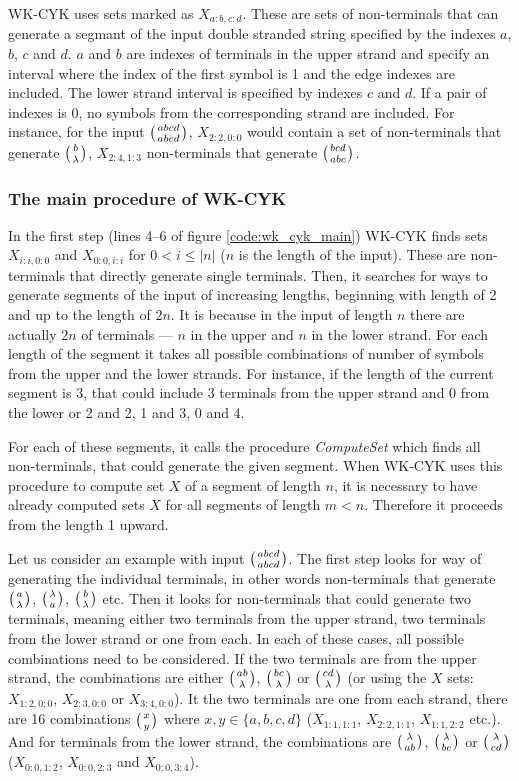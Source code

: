WK-CYK uses sets marked as $X_{a:b,c:d}$. These are sets of non-terminals that can generate a segmant of the input double stranded string specified by the indexes $a$, $b$, $c$ and $d$. $a$ and $b$ are indexes of terminals in the upper strand and specify an interval where the index of the first symbol is 1 and the edge indexes are included. The lower strand interval is specified by indexes $c$ and $d$. If a pair of indexes is 0, no symbols from the corresponding strand are included. For instance, for the input $\wkpair{abcd}{abcd}$, $X_{2:2,0:0}$ would contain a set of non-terminals that generate $\wkpair{b}{\lambda}$, $X_{2:4,1:3}$ non-terminals that generate $\wkpair{bcd}{abc}$.

\subsubsection{The main procedure of WK-CYK}
In the first step (lines 4--6 of figure \ref{code:wk_cyk_main}) WK-CYK finds sets $X_{i:i,0:0}$ and $X_{0:0,i:i}$ for $0 < i \leq |n|$ ($n$ is the length of the input). These are non-terminals that directly generate single terminals. Then, it searches for ways to generate segments of the input of increasing lengths, beginning with length of 2 and up to the length of $2n$. It is because in the input of length $n$ there are actually $2n$ of terminals --- $n$ in the upper and $n$ in the lower strand. For each length of the segment it takes all possible combinations of number of symbols from the upper and the lower strands. For instance, if the length of the current segment is 3, that could include 3 terminals from the upper strand and 0 from the lower or 2 and 2, 1 and 3, 0 and 4.

For each of these segments, it calls the procedure \textit{ComputeSet} which finds all non-terminals, that could generate the given segment. When WK-CYK uses this procedure to compute set $X$ of a segment of length $n$, it is necessary to have already computed sets $X$ for all segments of length $m < n$. Therefore it proceeds from the length 1 upward.

Let us consider an example with input $\wkpair{abcd}{abcd}$. The first step looks for way of generating the individual terminals, in other words non-terminals that generate $\wkpair{a}{\lambda}$, $\wkpair{\lambda}{a}$, $\wkpair{b}{\lambda}$ etc. Then it looks for non-terminals that could generate two terminals, meaning either two terminals from the upper strand, two terminals from the lower strand or one from each. In each of these cases, all possible combinations need to be considered. If the two terminals are from the upper strand, the combinations are either $\wkpair{ab}{\lambda}$, $\wkpair{bc}{\lambda}$ or $\wkpair{cd}{\lambda}$ (or using the $X$ sets: $X_{1:2,0:0}$, $X_{2:3,0:0}$ or $X_{3:4,0:0}$). It the two terminals are one from each strand, there are 16 combinations $\wkpair{x}{y}$ where $x, y \in \{a, b, c, d\}$ ($X_{1:1,1:1}$, $X_{2:2,1:1}$, $X_{1:1,2:2}$ etc.). And for terminals from the lower strand, the combinations are $\wkpair{\lambda}{ab}$, $\wkpair{\lambda}{bc}$ or $\wkpair{\lambda}{cd}$ ($X_{0:0,1:2}$, $X_{0:0,2:3}$ and $X_{0:0,3:4}$).

